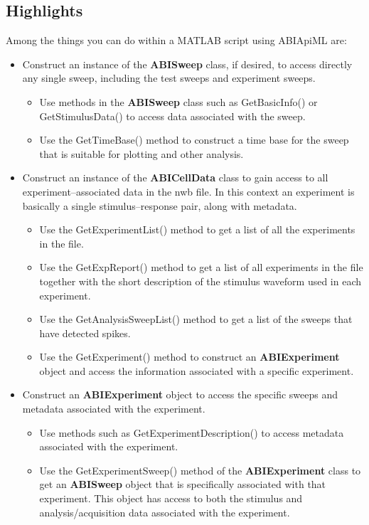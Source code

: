 \documentclass{article}
\begin{document}
\subsection{Highlights}
Among the things you can do within a MATLAB script using ABIApiML are:
\begin{itemize}
	\item Construct an instance of the \textbf{ABISweep} class, if desired, to access directly any single sweep, including the test sweeps and experiment sweeps.
	\begin{itemize}
		\item Use methods in the \textbf{ABISweep} class such as GetBasicInfo() or GetStimulusData() to access data associated with the sweep.
		\item Use the GetTimeBase() method to construct a time base for the sweep that is suitable for plotting and other analysis.  
	\end{itemize}
	\item Construct an instance of the \textbf{ABICellData} class to gain access to all experiment--associated data in the nwb file. In this context an experiment is basically a single stimulus--response pair, along with metadata.
	\begin{itemize}
		\item Use the GetExperimentList() method to get a list of all the experiments in the file.
		\item Use the GetExpReport() method to get a list of all experiments in the file together with the short description of the stimulus waveform used in each experiment.
		\item Use the GetAnalysisSweepList() method to get a list of the sweeps that have detected spikes.
		\item Use the GetExperiment() method to construct an \textbf{ABIExperiment} object and access the information associated with a specific experiment.
	\end{itemize}
	\item Construct an \textbf{ABIExperiment} object to access the specific sweeps and metadata associated with the experiment.
	\begin{itemize}
		\item Use methods such as GetExperimentDescription() to access metadata associated with the experiment.
		\item Use the GetExperimentSweep() method of the \textbf{ABIExperiment} class to get an \textbf{ABISweep} object that is specifically associated with that experiment. This object has access to both the stimulus and analysis/acquisition data associated with the experiment.
	\end{itemize}
\end{itemize}
\end{document}
